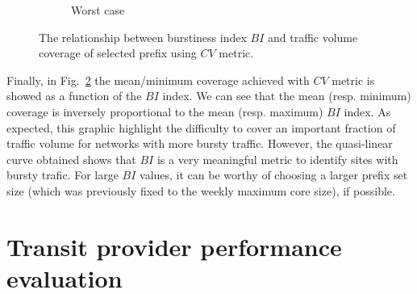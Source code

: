 \begin{figure}[!tb]
\begin{subfigure}[b]{0.53\textwidth}
                \caption{Worst case}
                \label{fig:bi_cvg_worst}
        \end{subfigure}
\caption{The relationship between burstiness index $BI$ and traffic volume coverage of selected prefix using $CV$ metric.}
\label{fig:bi_cvg}
\end{figure}

Finally, in Fig.~\ref{fig:bi_cvg} the mean/minimum coverage achieved with $CV$ metric is showed as a function of the $BI$ index. We can see that the mean (resp. minimum) coverage is inversely proportional to the mean (resp. maximum) $BI$ index. As expected, this graphic highlight the difficulty to cover an important fraction of traffic volume for networks with more bursty traffic. However, the quasi-linear curve obtained shows that $BI$ is a very meaningful metric to identify sites with bursty trafic. For large $BI$ values, it can be worthy of choosing a larger prefix set size (which was previously fixed to the weekly maximum core size), if possible. 

\section{Transit provider performance evaluation}
\label{sec:rtt}

